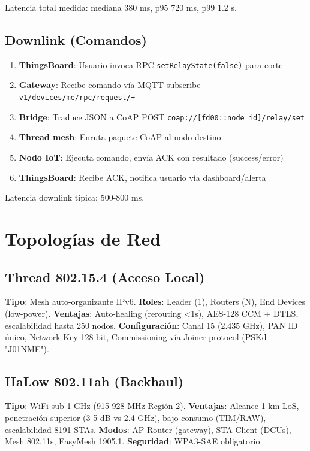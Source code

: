 Latencia total medida: mediana 380 ms, p95 720 ms, p99 1.2 s.

\subsection{Downlink (Comandos)}

\begin{enumerate}
    \item \textbf{ThingsBoard}: Usuario invoca RPC \texttt{setRelayState(false)} para corte
    \item \textbf{Gateway}: Recibe comando vía MQTT subscribe \texttt{v1/devices/me/rpc/request/+}
    \item \textbf{Bridge}: Traduce JSON a CoAP POST \texttt{coap://[fd00::node\_id]/relay/set}
    \item \textbf{Thread mesh}: Enruta paquete CoAP al nodo destino
    \item \textbf{Nodo IoT}: Ejecuta comando, envía ACK con resultado (success/error)
    \item \textbf{ThingsBoard}: Recibe ACK, notifica usuario vía dashboard/alerta
\end{enumerate}

Latencia downlink típica: 500-800 ms.

\section{Topologías de Red}

\subsection{Thread 802.15.4 (Acceso Local)}

\textbf{Tipo}: Mesh auto-organizante IPv6. \textbf{Roles}: Leader (1), Routers (N), End Devices (low-power). \textbf{Ventajas}: Auto-healing (rerouting <1s), AES-128 CCM + DTLS, escalabilidad hasta 250 nodos. \textbf{Configuración}: Canal 15 (2.435 GHz), PAN ID único, Network Key 128-bit, Commissioning vía Joiner protocol (PSKd "J01NME").

\subsection{HaLow 802.11ah (Backhaul)}

\textbf{Tipo}: WiFi sub-1 GHz (915-928 MHz Región 2). \textbf{Ventajas}: Alcance 1 km LoS, penetración superior (3-5 dB vs 2.4 GHz), bajo consumo (TIM/RAW), escalabilidad 8191 STAs. \textbf{Modos}: AP Router (gateway), STA Client (DCUs), Mesh 802.11s, EasyMesh 1905.1. \textbf{Seguridad}: WPA3-SAE obligatorio.

